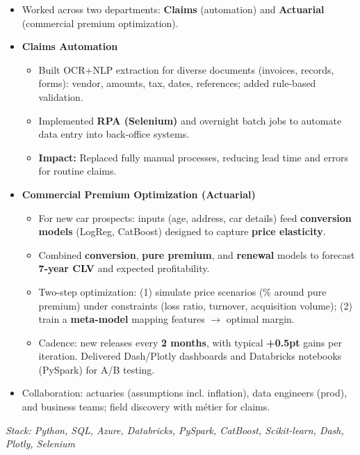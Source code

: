\documentclass[10pt,a4paper]{altacv}
\begin{document}
\divider

\begin{itemize}
  \item Worked across two departments: \textbf{Claims} (automation) and \textbf{Actuarial} (commercial premium optimization).
  \item \textbf{Claims Automation}
  \begin{itemize}
    \item Built OCR+NLP extraction for diverse documents (invoices, records, forms): vendor, amounts, tax, dates, references; added rule-based validation.
    \item Implemented \textbf{RPA (Selenium)} and overnight batch jobs to automate data entry into back-office systems.
    \item \textbf{Impact:} Replaced fully manual processes, reducing lead time and errors for routine claims.
  \end{itemize}
  \item \textbf{Commercial Premium Optimization (Actuarial)}
  \begin{itemize}
    \item For new car prospects: inputs (age, address, car details) feed \textbf{conversion models} (LogReg, CatBoost) designed to capture \textbf{price elasticity}.
    \item Combined \textbf{conversion}, \textbf{pure premium}, and \textbf{renewal} models to forecast \textbf{7-year CLV} and expected profitability.
    \item Two-step optimization: (1) simulate price scenarios (\% around pure premium) under constraints (loss ratio, turnover, acquisition volume); (2) train a \textbf{meta-model} mapping features $\rightarrow$ optimal margin.
    \item Cadence: new releases every \textbf{2 months}, with typical \textbf{+0.5pt} gains per iteration. Delivered Dash/Plotly dashboards and Databricks notebooks (PySpark) for A/B testing.
  \end{itemize}
  \item Collaboration: actuaries (assumptions incl. inflation), data engineers (prod), and business teams; field discovery with m\'etier for claims.
\end{itemize}
\textit{Stack: Python, SQL, Azure, Databricks, PySpark, CatBoost, Scikit-learn, Dash, Plotly, Selenium}

\divider
\end{document}
